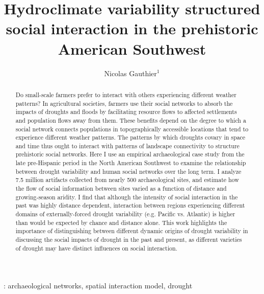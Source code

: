 \documentclass[10pt]{iopart}
\begin{document}
\title{Hydroclimate variability structured social interaction in the prehistoric American Southwest}

\author{Nicolas Gauthier$^1$}

\address{$^1$ School of Human Evolution and Social Change, 900 S Caddy Mall, Tempe, USA}


\begin{abstract}
  Do small-scale farmers prefer to interact with others experiencing different weather patterns? In agricultural societies, farmers use their social networks to absorb the impacts of droughts and floods by facilitating resource flows to affected settlements and population flows away from them. These benefits depend on the degree to which a social network connects populations in topographically accessible locations that tend to experience different weather patterns. The patterns by which droughts covary in space and time thus ought to interact with patterns of landscape connectivity to structure prehistoric social networks. Here I use an empirical archaeological case study from the late pre-Hispanic period in the North American Southwest to examine the relationship between drought variability and human social networks over the long term. I analyze 7.5 million artifacts collected from nearly 500 archaeological sites, and estimate how the flow of social information between sites varied as a function of distance and growing-season aridity. I find that although the intensity of social interaction in the past was highly distance dependent, interaction between regions experiencing different domains of externally-forced drought variability (e.g. Pacific vs. Atlantic) is higher than would be expected by chance and distance alone. This work highlights the importance of distinguishing between different dynamic origins of drought variability in discussing the social impacts of drought in the past and present, as different varieties of drought may have distinct influences on social interaction.
\end{abstract}

: archaeological networks, spatial interaction model, drought

\maketitle

\ioptwocol
\end{document}
